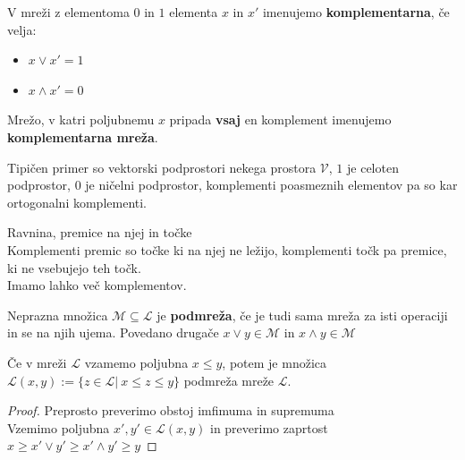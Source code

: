 \documentclass[slovene]{beamer}
\begin{document}
\begin{frame}
\begin{definition}
V mreži z elementoma $0$ in $1$ elementa $x$ in $x'$ imenujemo \textbf{komplementarna}, če velja:
\begin{itemize}
\item $x \lor x' = 1$
\item $x \land x' = 0$
\end{itemize}
\end{definition}

\begin{definition}
Mrežo, v katri poljubnemu $x$ pripada \textbf{vsaj} en komplement imenujemo \textbf{komplementarna mreža}.
\end{definition}

\end{frame}

\begin{frame}
\begin{example}
Tipičen primer so vektorski podprostori nekega prostora $\mathcal{V}$, $1$ je celoten podprostor, $0$ je ničelni podprostor, komplementi poasmeznih elementov pa so kar ortogonalni komplementi.
\end{example}

\begin{example}
Ravnina, premice na njej in točke\\
Komplementi premic so točke ki na njej ne ležijo, komplementi točk pa premice, ki ne vsebujejo teh točk.\\
Imamo lahko več komplementov.
\end{example}

\end{frame}

\begin{frame}
\begin{definition}
Neprazna množica $\mathcal{M} \subseteq \mathcal{L}$ je \textbf{podmreža}, če je tudi sama mreža za isti operaciji in se na njih ujema. Povedano drugače $x \lor y \in \mathcal{M}$ in $x \land y \in \mathcal{M}$
\end{definition}
\end{frame}

\begin{frame}
\begin{theorem}
Če v mreži $\mathcal{L}$ vzamemo poljubna $x \leq y$, potem je množica $\mathcal{L}(x,y) := \{ z \in \mathcal{L} | \ x \leq z \leq y \}$ podmreža mreže $\mathcal{L}$.
\end{theorem}

\begin{proof}
Preprosto preverimo obstoj imfimuma in supremuma\\ \pause
Vzemimo poljubna $x',y' \in \mathcal{L}(x,y)$ in preverimo zaprtost\\ \pause $x \geq x' \lor y' \geq x' \land y' \geq y$
\end{proof}

\end{frame}
\end{document}
